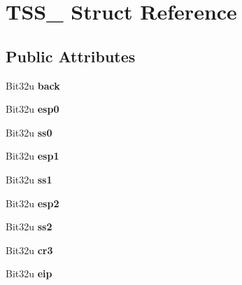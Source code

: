 \hypertarget{structTSS__32}{\section{T\-S\-S\-\_ Struct Reference}
\label{structTSS__32}
}
\subsection*{Public Attributes}
\begin{DoxyCompactItemize}
\item 
\hypertarget{structTSS__32_a98741664727863a833cb787e3b681dd4}{Bit32u {\bfseries back}}\label{structTSS__32_a98741664727863a833cb787e3b681dd4}

\item 
\hypertarget{structTSS__32_aa9dc54798a454f2f40f3e4f7fc3820b0}{Bit32u {\bfseries esp0}}\label{structTSS__32_aa9dc54798a454f2f40f3e4f7fc3820b0}

\item 
\hypertarget{structTSS__32_ac7f8cf0ec209f734f1cf22e22c44d53d}{Bit32u {\bfseries ss0}}\label{structTSS__32_ac7f8cf0ec209f734f1cf22e22c44d53d}

\item 
\hypertarget{structTSS__32_ab938b2e4f69fae46803341f05caf9431}{Bit32u {\bfseries esp1}}\label{structTSS__32_ab938b2e4f69fae46803341f05caf9431}

\item 
\hypertarget{structTSS__32_aee5f41c630f14ae1be0fa5c5550c1202}{Bit32u {\bfseries ss1}}\label{structTSS__32_aee5f41c630f14ae1be0fa5c5550c1202}

\item 
\hypertarget{structTSS__32_aef5dbfbe53940ca1f7fe8e57b04b320f}{Bit32u {\bfseries esp2}}\label{structTSS__32_aef5dbfbe53940ca1f7fe8e57b04b320f}

\item 
\hypertarget{structTSS__32_ac3e54f2043b777ad21d5e8aa50e5213b}{Bit32u {\bfseries ss2}}\label{structTSS__32_ac3e54f2043b777ad21d5e8aa50e5213b}

\item 
\hypertarget{structTSS__32_aad262841bd71d90d44e77e4d366dee48}{Bit32u {\bfseries cr3}}\label{structTSS__32_aad262841bd71d90d44e77e4d366dee48}

\item 
\hypertarget{structTSS__32_a85601e5dc99da4f5bf9b6d5e12eae2b2}{Bit32u {\bfseries eip}}\label{structTSS__32_a85601e5dc99da4f5bf9b6d5e12eae2b2}


\end{DoxyCompactItemize}

